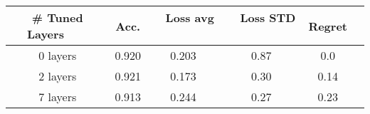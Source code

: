 \begin{tabular}{cccccc}
\toprule
\# Tuned Layers \ \ \ & Acc.  & \ \ Loss avg \ &  \ \ Loss STD \ \ & Regret\\
\hline
0 layers    & 0.920 &  0.203 & 0.87 & 0.0   \\
2 layers    & 0.921 &  0.173 & 0.30 & 0.14  \\
7 layers    & 0.913 &  0.244 & 0.27 & 0.23  \\
\bottomrule
\end{tabular}
